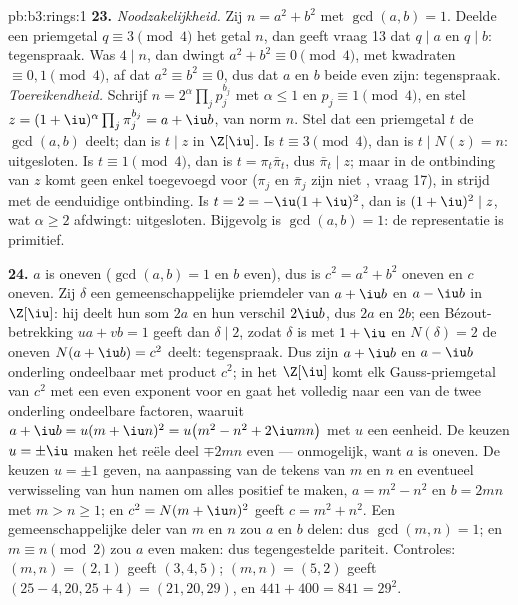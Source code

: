 \begin{solution}{pb:b3:rings:1}
\textbf{23.} \emph{Noodzakelijkheid.} Zij $n = a^2 + b^2$ met
$\gcd(a, b) = 1$. Deelde een priemgetal $q \equiv 3 \pmod 4$ het
getal $n$, dan geeft vraag 13 dat $q \mid a$ en $q \mid b$:
tegenspraak. Was $4 \mid n$, dan dwingt $a^2 + b^2 \equiv 0 \pmod
4$, met kwadraten $\equiv 0, 1 \pmod 4$, af dat $a^2 \equiv b^2
\equiv 0$, dus dat $a$ en $b$ beide even zijn: tegenspraak.
\emph{Toereikendheid.} Schrijf $n = 2^{\alpha}\prod_jp_j^{b_j}$ met
$\alpha \leq 1$ en $p_j \equiv 1 \pmod 4$, en stel $z =
(1+\iu)^{\alpha}\prod_j \pi_j^{b_j} = a + \iu b$, van norm $n$.
Stel dat een priemgetal $t$ de $\gcd(a, b)$ deelt; dan is $t \mid
z$ in $\Z[\iu]$. Is $t \equiv 3 \pmod 4$, dan is $t \mid N(z) = n$:
uitgesloten. Is $t \equiv 1 \pmod 4$, dan is $t = \pi_t\bar\pi_t$,
dus $\bar\pi_t \mid z$; maar in de ontbinding van $z$ komt geen
enkel toegevoegd  voor ($\pi_j$ en $\bar\pi_j$ zijn
niet , vraag 17), in strijd met de eenduidige
ontbinding. Is $t = 2 = -\iu(1+\iu)^2$, dan is $(1+\iu)^2 \mid z$,
wat $\alpha \geq 2$ afdwingt: uitgesloten. Bijgevolg is $\gcd(a, b)
= 1$: de representatie is primitief.

\textbf{24.} $a$ is oneven ($\gcd(a, b) = 1$ en $b$ even), dus is
$c^2 = a^2 + b^2$ oneven en $c$ oneven. Zij $\delta$ een
gemeenschappelijke priemdeler van $a + \iu b$ en $a - \iu b$ in
$\Z[\iu]$: hij deelt hun som $2a$ en hun verschil $2\iu b$, dus
$2a$ en $2b$; een Bézout-betrekking $ua + vb = 1$ geeft dan $\delta
\mid 2$, zodat $\delta$  is met $1 + \iu$ en $N(\delta)
= 2$ de oneven $N(a + \iu b) = c^2$ deelt: tegenspraak. Dus zijn $a
+ \iu b$ en $a - \iu b$ onderling ondeelbaar met product $c^2$; in
het  $\Z[\iu]$ komt elk Gauss-priemgetal van $c^2$ met een even
exponent voor en gaat het volledig naar een van de twee onderling
ondeelbare factoren, waaruit $a + \iu b = u(m + \iu n)^2 =
u\bigl(m^2 - n^2 + 2\iu mn\bigr)$ met $u$ een eenheid. De keuzen $u
= \pm\iu$ maken het reële deel $\mp 2mn$ even --- onmogelijk, want
$a$ is oneven. De keuzen $u = \pm1$ geven, na aanpassing van de
tekens van $m$ en $n$ en eventueel verwisseling van hun namen om
alles positief te maken, $a = m^2 - n^2$ en $b = 2mn$ met $m > n
\geq 1$; en $c^2 = N(m + \iu n)^2$ geeft $c = m^2 + n^2$. Een
gemeenschappelijke deler van $m$ en $n$ zou $a$ en $b$ delen: dus
$\gcd(m, n) = 1$; en $m \equiv n \pmod 2$ zou $a$ even maken: dus
tegengestelde pariteit. Controles: $(m, n) = (2, 1)$ geeft $(3, 4,
5)$; $(m, n) = (5, 2)$ geeft $(25 - 4, 20, 25 + 4) = (21, 20, 29)$,
en $441 + 400 = 841 = 29^2$.


\end{solution}
